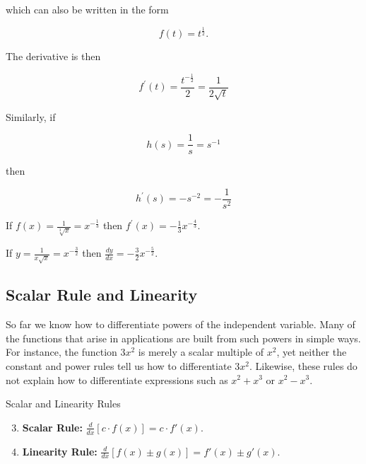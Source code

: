 which can also be written in the form

\[
f(t)=t^{\frac{1}{2}} .
\]

The derivative is then

\[
f^{\prime}(t)=\frac{t^{-\frac{1}{2}}}{2}=\frac{1}{2 \sqrt{t}}
\]

Similarly, if

\[
h(s)=\frac{1}{s}=s^{-1}
\]

then

\[
h^{\prime}(s)=-s^{-2}=-\frac{1}{s^{2}}
\]

\begin{example}

If $f(x)=\frac{1}{\sqrt[3]{x}}=x^{-\frac{1}{3}}$ then $f^{\prime}(x)=-\frac{1}{3} x^{-\frac{4}{3}}$.
\end{example}

\begin{example}

If $y=\frac{1}{x \sqrt{x}}=x^{-\frac{3}{2}}$ then $\frac{d y}{d x}=-\frac{3}{2} x^{-\frac{5}{2}}$.
\end{example}


\subsection*{Scalar Rule and Linearity}

So far we know how to differentiate powers of the independent variable. Many of the functions that arise in applications are built from such powers in simple ways. For instance, the function  $3x^2$ is merely a scalar multiple of $x^2$, yet neither the constant and power rules tell us how to differentiate $3x^2$. Likewise, these rules do not explain how to differentiate expressions such as $x^{2} + x^{3}$ or $x^{2} - x^{3}$.

\begin{theorem}{Scalar and Linearity Rules}
    \begin{enumerate}
        \setcounter{enumi}{2}
        \vspace{0.5em}
        \item \textbf{Scalar Rule:} \( \frac{d}{dx}[c \cdot f(x)] = c \cdot f'(x) \). \vspace{0.5em}
        \item \textbf{Linearity Rule:} \( \frac{d}{dx}[f(x) \pm g(x)] = f'(x) \pm g'(x) \). \vspace{0.5em}
    \end{enumerate}
\end{theorem}

